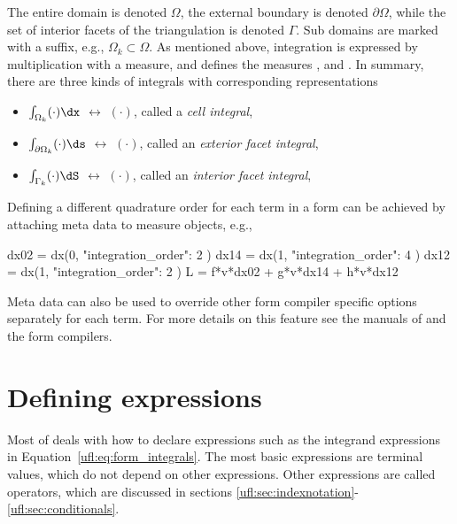 The entire domain is denoted $\Omega$, the external boundary is
denoted $\partial\Omega$, while the set of interior facets of the
triangulation is denoted $\Gamma$. Sub domains are marked with a
suffix, e.g., $\Omega_k \subset \Omega$. As mentioned above,
integration is expressed by multiplication with a measure, and \ufl{}
defines the measures ,  and .  In
summary, there are three kinds of integrals with corresponding \ufl{}
representations
\begin{itemize}
\item $\int_{        \Omega_k} (\cdot) \dx$ $\leftrightarrow$  $(\cdot)$, called a \emph{cell integral},
\item $\int_{\partial\Omega_k} (\cdot) \ds$ $\leftrightarrow$  $(\cdot)$, called an \emph{exterior facet integral},
\item $\int_{        \Gamma_k} (\cdot) \dS$ $\leftrightarrow$  $(\cdot)$, called an \emph{interior facet integral},
\end{itemize}
Defining a different quadrature order for each term in a form can be
achieved by attaching meta data to measure objects, e.g.,
\begin{code}
dx02 = dx(0, { "integration_order": 2 })
dx14 = dx(1, { "integration_order": 4 })
dx12 = dx(1, { "integration_order": 2 })
L = f*v*dx02 + g*v*dx14 + h*v*dx12
\end{code}
Meta data can also be used to override other form compiler specific
options separately for each term. For more details on this feature see
the manuals of \ufl{} and the form compilers.


\section{Defining expressions}
\label{ufl:sec:defexpr}

Most of \ufl{} deals with how to declare expressions such as the
integrand expressions in Equation~\ref{ufl:eq:form_integrals}.  The
most basic expressions are terminal values, which do not depend on
other expressions.  Other expressions are called operators, which are
discussed in sections
\ref{ufl:sec:indexnotation}-\ref{ufl:sec:conditionals}.

